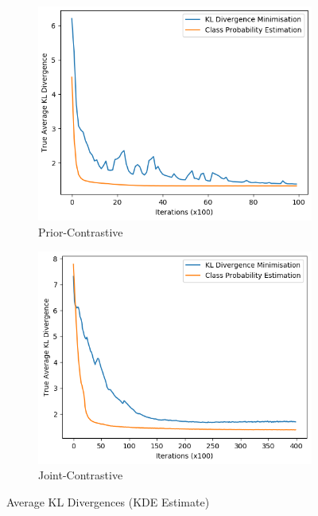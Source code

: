 \documentclass[honours,12pt]{unswthesis}
\numberwithin{equation}{section}
\theoremstyle{definition}
\begin{document}
\begin{figure}[t!]
\begin{subfigure}{0.49\textwidth}
\includegraphics[width=\linewidth]{truklmins/PCKLvsPCADV.png}
\caption{Prior-Contrastive}
\end{subfigure}
\begin{subfigure}{0.49\textwidth}
\includegraphics[width=\linewidth]{truklmins/JCKLvsJCADV.png}
\caption{Joint-Contrastive}
\end{subfigure}
\caption{Average KL Divergences (KDE Estimate)}
\end{figure}
\end{document}
